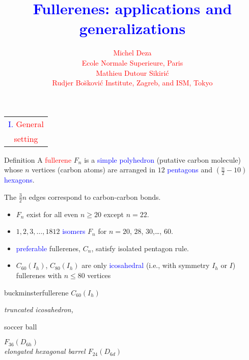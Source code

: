 \documentclass[%
pdf,
colorBG,
slideColor,
]{prosper}
\title{\Huge \textcolor{blue}{Fullerenes: applications and generalizations}}
\author{
\textcolor{red}{\Large Michel Deza}\\[2mm]
\textcolor{red}{\large Ecole Normale Superieure, Paris}\\[2mm]
\textcolor{red}{\Large Mathieu Dutour Sikiri\'c}\\[2mm]
\textcolor{red}{\large Rudjer Bo\u skovi\'c Institute, Zagreb, and ISM, Tokyo}
}
\date{}
\begin{document}
\maketitle




\begin{slide}{}
\begin{center}
{\Huge 
\begin{tabular*}{5cm}{c}
\\[-0.5cm]
\textcolor{blue}{I. }\textcolor{red}{General}\\
\textcolor{red}{setting}
\end{tabular*}
}
\end{center}
\end{slide}



\begin{slide}{Definition}
A \textcolor{red}{fullerene} $F_n$ is a \textcolor{blue}{simple polyhedron} (putative carbon molecule) whose $n$ vertices (carbon atoms) are arranged in $12$ \textcolor{blue}{pentagons} and $(\frac{n}{2}-10)$ \textcolor{blue}{hexagons}.

The $\frac{3}{2}n$ edges correspond to carbon-carbon bonds.
\begin{itemize}
\item $F_n$ exist for all even $n\geq 20$ except $n=22$.
\item $1,2,3,\dots,1812$ \textcolor{blue}{isomers} $F_n$ for $n=20$, $28$, $30$,\dots, $60$.
\item \textcolor{blue}{preferable} fullerenes, $C_n$, satisfy isolated pentagon rule.
\item $C_{60}(I_h)$, $C_{80}(I_h)$ are only \textcolor{blue}{icosahedral}
(i.e., with symmetry $I_h$ or $I$) fullerenes with $n \le 80$ vertices
\end{itemize}
\end{slide}




\begin{slide}{}
\begin{center}
\begin{minipage}[b]{5.5cm}
\centering
{}\par
buckminsterfullerene $C_{60}(I_h)$\\
{\em truncated icosahedron, \par
soccer ball}
\end{minipage}
\hspace{0.1cm}
\begin{minipage}[b]{5.5cm}
\centering
{}\par
$F_{36}(D_{6h})$\\
{\em elongated hexagonal barrel $F_{24}(D_{6d})$}
\end{minipage}
\end{center}
\end{slide}
\end{document}
